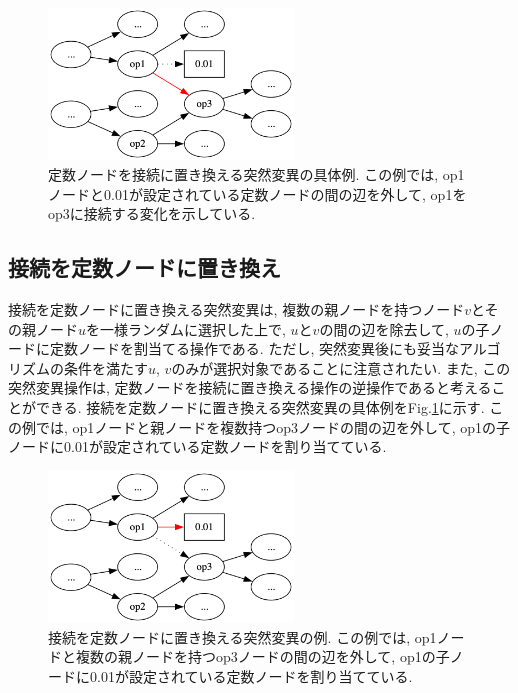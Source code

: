 \documentclass[11pt,oneside,openany,report]{jsbook}
\begin{document}
\begin{figure}
  \centering
  \includegraphics[width=6.5cm]{mgg_automl_zero_vag/mutations/const_to_connection.png}
  \caption{定数ノードを接続に置き換える突然変異の具体例. この例では, op1ノードと0.01が設定されている定数ノードの間の辺を外して, op1をop3に接続する変化を示している.}
  \label{fig:mgg_automl_zero_vag:mutation:const_to_connection}
\end{figure}

\subsection{接続を定数ノードに置き換え}
接続を定数ノードに置き換える突然変異は, 複数の親ノードを持つノード$v$とその親ノード$u$を一様ランダムに選択した上で, $u$と$v$の間の辺を除去して, $u$の子ノードに定数ノードを割当てる操作である. ただし, 突然変異後にも妥当なアルゴリズムの条件を満たす$u$, $v$のみが選択対象であることに注意されたい. また, この突然変異操作は, 定数ノードを接続に置き換える操作の逆操作であると考えることができる. 接続を定数ノードに置き換える突然変異の具体例をFig.\ref{fig:mgg_automl_zero_vag:mutation:const_to_connection}に示す. この例では, op1ノードと親ノードを複数持つop3ノードの間の辺を外して, op1の子ノードに0.01が設定されている定数ノードを割り当てている.


\begin{figure}
  \centering
  \includegraphics[width=6.5cm]{mgg_automl_zero_vag/mutations/connection_to_const.png}
  \caption{接続を定数ノードに置き換える突然変異の例. この例では, op1ノードと複数の親ノードを持つop3ノードの間の辺を外して, op1の子ノードに0.01が設定されている定数ノードを割り当てている.}
  \label{fig:mgg_automl_zero_vag:mutation:connection_to_const}
\end{figure}
\end{document}
